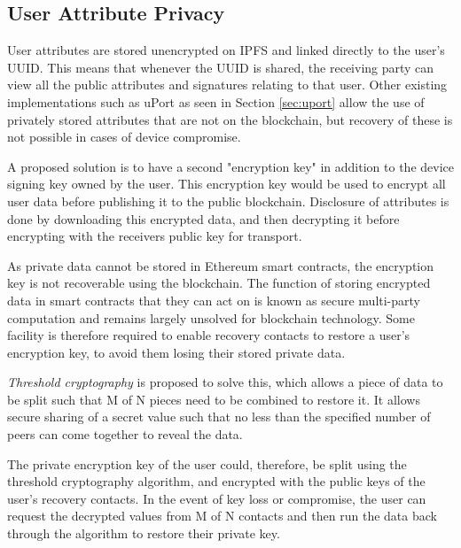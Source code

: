 \subsection{User Attribute Privacy}
\label{sec:user-attribute-privacy}
User attributes are stored unencrypted on \ac{IPFS} and linked directly to the user's \ac{UUID}. This means that whenever the \ac{UUID} is shared, the receiving party can view all the public attributes and signatures relating to that user. Other existing implementations such as uPort as seen in Section \ref{sec:uport} allow the use of privately stored attributes that are not on the blockchain, but recovery of these is not possible in cases of device compromise.

A proposed solution is to have a second "encryption key" in addition to the device signing key owned by the user. This encryption key would be used to encrypt all user data before publishing it to the public blockchain. Disclosure of attributes is done by downloading this encrypted data, and then decrypting it before encrypting with the receivers public key for transport.

As private data cannot be stored in Ethereum smart contracts, the encryption key is not recoverable using the blockchain. The function of storing encrypted data in smart contracts that they can act on is known as secure multi-party computation \cite{andrychowicz_secure_2014} and remains largely unsolved for blockchain technology. Some facility is therefore required to enable recovery contacts to restore a user's encryption key, to avoid them losing their stored private data.

\textit{Threshold cryptography} \cite{desmedt_threshold_1994} is proposed to solve this, which allows a piece of data to be split such that M of N pieces need to be combined to restore it. It allows secure sharing of a secret value such that no less than the specified number of peers can come together to reveal the data.

The private encryption key of the user could, therefore, be split using the threshold cryptography algorithm, and encrypted with the public keys of the user's recovery contacts. In the event of key loss or compromise, the user can request the decrypted values from M of N contacts and then run the data back through the algorithm to restore their private key.